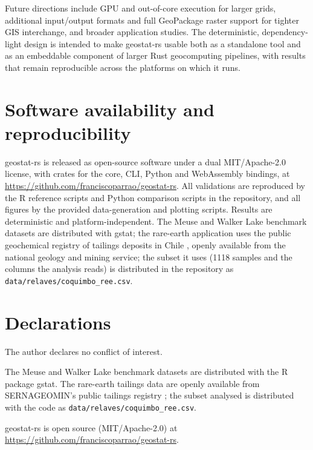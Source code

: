 \documentclass[pdflatex,sn-mathphys-ay]{sn-jnl}
\begin{document}
Future directions include GPU and out-of-core execution for larger grids,
additional input/output formats and full GeoPackage raster support for tighter
GIS interchange, and broader application studies. The deterministic,
dependency-light design is intended to make geostat-rs usable both as a
standalone tool and as an embeddable component of larger Rust geocomputing
pipelines, with results that remain reproducible across the platforms on which
it runs.

\section{Software availability and reproducibility}\label{sec:availability}

geostat-rs is released as open-source software under a dual MIT/Apache-2.0
license, with crates for the core, CLI, Python and WebAssembly bindings, at
\url{https://github.com/franciscoparrao/geostat-rs}. All validations are
reproduced by the R reference scripts and Python comparison scripts in the
repository, and all figures by the provided data-generation and plotting
scripts. Results are deterministic and platform-independent. The Meuse and
Walker Lake benchmark datasets are distributed with gstat; the
rare-earth application uses the public geochemical registry of tailings
deposits in Chile \citep{sernageomin2023}, openly available from the national geology and mining service; the subset it uses (1118 samples and the columns the analysis reads) is distributed in the repository as \texttt{data/relaves/coquimbo\_ree.csv}.

\backmatter


\section*{Declarations}


The author declares no conflict of interest.

The Meuse and Walker Lake benchmark datasets are distributed with the R
package gstat. The rare-earth tailings data are openly available from SERNAGEOMIN's public tailings registry \citep{sernageomin2023}; the subset analysed is distributed with the code as \texttt{data/relaves/coquimbo\_ree.csv}.

geostat-rs is open source (MIT/Apache-2.0) at
\url{https://github.com/franciscoparrao/geostat-rs}.


\end{document}
